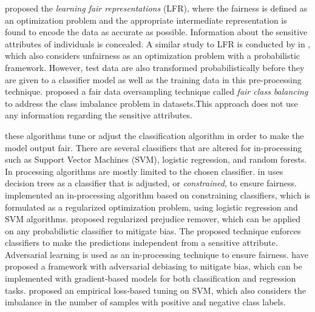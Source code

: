 \citeauthor{zemel2013fair_learning} \cite{zemel2013fair_learning} proposed the \emph{learning fair representations} (LFR), where the fairness is defined as an optimization problem and the appropriate intermediate representation is found to encode the data as accurate as possible. Information about the sensitive attributes of individuals is concealed. 
A similar study to LFR \cite{zemel2013fair_learning} is conducted by \citeauthor{calmon2017optimized_pre} in \cite{calmon2017optimized_pre}, which also considers unfairness as an optimization problem with a probabilistic framework. However, test data are also transformed probabilistically before they are given to a classifier model as well as the training data in this pre-processing technique. 
\citeauthor{yan2020fair-balance} \cite{yan2020fair-balance} proposed a fair data oversampling technique called \emph{fair class balancing} to address the class imbalance problem in datasets.This approach does not use any information regarding the sensitive attributes.  


these algorithms tune or adjust the classification algorithm in order to make the model output fair. There are several classifiers that are altered for in-processing such as Support Vector Machines (SVM), logistic regression, and random forests. In processing algorithms are mostly limited to the chosen classifier. \citeauthor{kamiran2010decision-tree} in \cite{kamiran2010decision-tree} uses decision trees as a classifier that is  adjusted, or \emph{constrained}, to ensure fairness.
\citeauthor{zafar2017fairness-cons} \cite{zafar2017fairness-cons} implemented an in-processing algorithm based on constraining classifiers, which is formulated as a regularized optimization problem, using logistic regression and SVM algorithms. \citeauthor{kamishima2011fairness} \cite{kamishima2011fairness} proposed regularized prejudice remover, which can be applied on any probabilistic classifier to mitigate bias. The proposed technique enforces classifiers to make the predictions independent from a sensitive attribute. 
Adversarial learning is used as an in-processing technique to ensure fairness. \citeauthor{zhang2018adversarial} \cite{zhang2018adversarial} have proposed a framework with adversarial debiasing to mitigate bias, which can be implemented with gradient-based models for both classification and regression tasks. 
\citeauthor{ristanoski2013discr-aware} \cite{ristanoski2013discr-aware} proposed an empirical loss-based tuning on SVM, which also considers the imbalance in the number of samples with positive and negative class labels. 


